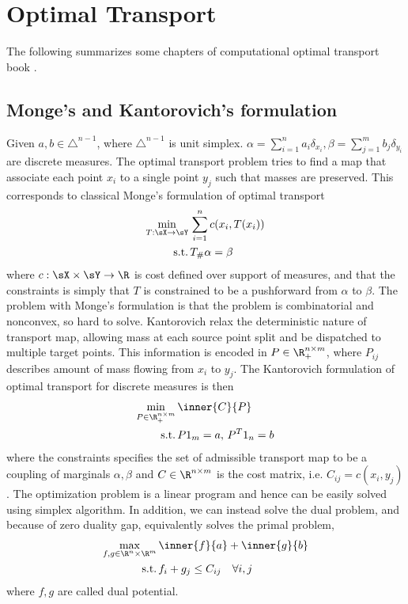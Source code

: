 \documentclass[11pt]{article}
\begin{document}
\section{Optimal Transport}

The following summarizes some chapters of computational optimal transport book \cite{peyreComputationalOptimalTransport2020}.

\subsection{Monge's and Kantorovich's formulation}

Given $a,b \in \triangle^{n-1}$, where $\triangle^{n-1}$ is unit simplex. $\alpha = \sum_{i=1}^n a_i \delta_{x_i}, \beta = \sum_{j=1}^m b_j \delta_{y_i}$ are discrete measures. The optimal transport problem tries to find a map that associate each point $x_i$ to a single point $y_j$ such that masses are preserved. This corresponds to classical Monge's formulation of optimal transport
\begin{align}
    \min_{T:\sX\to\sY}\,
        &\sum_{i=1}^n c(x_i, T(x_i)) \\
    \text{s.t.}\,
        &T_{\#}\alpha = \beta
\end{align}
where $c:\sX\times\sY \to\R$ is cost defined over support of measures, and that the constraints is simply that $T$ is constrained to be a pushforward from $\alpha$ to $\beta$. The problem with Monge's formulation is that the problem is combinatorial and nonconvex, so hard to solve. Kantorovich relax the deterministic nature of transport map, allowing mass at each source point split and be dispatched to multiple target points. This information is encoded in $P\in\R^{n\times m}_+$, where $P_{ij}$ describes amount of mass flowing from $x_i$ to $y_j$. The Kantorovich formulation of optimal transport for discrete measures is then
\begin{align}
    \min_{P\in\R^{n\times m}_+}\,
        &\inner{C}{P} \\
    \text{s.t.}\,
        &P1_m = a,\, P^T1_n = b
\end{align}
where the constraints specifies the set of admissible transport map to be a coupling of marginals $\alpha,\beta$ and $C\in\R^{n\times m}$ is the cost matrix, i.e. $C_{ij} = c(x_i,y_j)$. The optimization problem is a linear program and hence can be easily solved using simplex algorithm. In addition, we can instead solve the dual problem, and because of zero duality gap, equivalently solves the primal problem,
\begin{align}
    \max_{f,g\in\R^n\times\R^m}\,
        &\inner{f}{a} + \inner{g}{b} \\
    \text{s.t.}\,
        &f_i+g_j \leq C_{ij} \quad \forall i,j
\end{align}
where $f,g$ are called dual potential.
\end{document}

